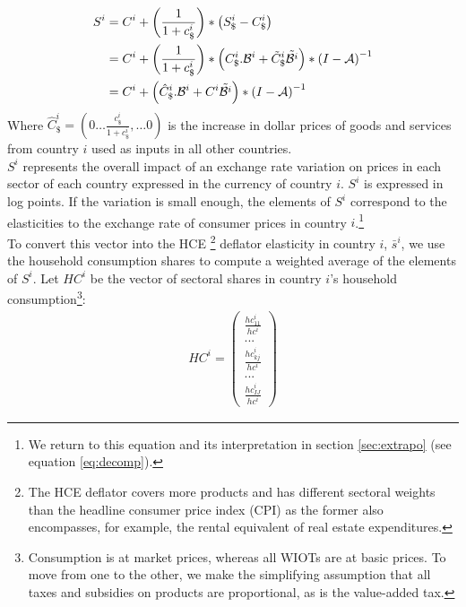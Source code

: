\documentclass[11pt,a4paper]{paper} %
\begin{document}
\begin{equation}
\begin{aligned}
	S^i&=C^i  + \left( \frac{1}{1+{{c}_\$^i}}\right)*\left({S_\$^i}-{{C}_{\$}^i}\right)\\
	&=C^i + \left( \frac{1}{1+{{c}_\$^i}}\right)*\left(C_\$^i.{\cal B}^i+{\tilde{C}_\$^i}{\tilde{{\cal B}^i}}\right)*{{(I-{\cal A})}^{-1}} 	\\
	&=C^i	+ \left(\hat{C}^i_\$.{\cal B}^i+{C^i}{\tilde{{\cal B}^i}}\right)*{{(I-{\cal A})}^{-1}}	
\label{eq:eqdomcurrency}
\end{aligned}
\end{equation}
Where $\hat{C}^i_\$=\left(0 \ldots \frac{c_\$^i}{1+c_\$^i},\ldots 0 \right)$ is the increase in dollar prices of goods and services from country $i$ used as inputs in all other countries.\\ 
$S^i$ represents the overall impact of an exchange rate variation on prices in each sector of each country expressed in the currency of country $i$. $S^i$ is expressed in log points. If the variation is small enough, the elements of $S^i$ correspond to the elasticities to the exchange rate of consumer prices in country $i$.\footnote{We return to this equation and its interpretation in section \ref{sec:extrapo} (see equation \ref{eq:decomp}).}\\
To convert this vector into the HCE \footnote{The HCE deflator covers more products and has different sectoral weights than the headline consumer price index (CPI) as the former also encompasses, for example, the rental equivalent of real estate expenditures.}
 deflator elasticity in country $i$, $\bar{s}^i$, we use the household consumption shares to compute a weighted average of the elements of $S^i$. Let $HC^i$ be the vector of sectoral shares in country $i$'s household consumption\footnote{Consumption is at market prices, whereas all WIOTs are at basic prices. To move from one to the other, we make the simplifying assumption that all taxes and subsidies on products are proportional, as is the value-added tax.}:
\begin{eqnarray*}
HC^i=\left( 
	\begin{array}{c}
	\frac{{hc}_{11}^i}{hc^i} \\
	...\\
	\frac{{hc}_{kj}^i}{hc^i}\\
	...\\
	\frac{{hc}_{IJ}^i}{hc^i}
	 \end{array}
	 \right)
\end{eqnarray*}
\end{document}
